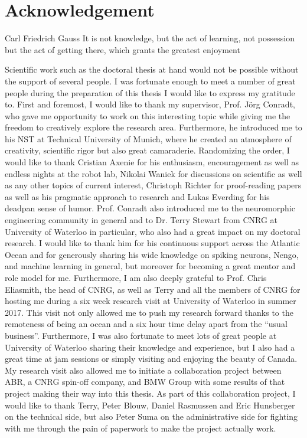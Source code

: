 \chapter*{Acknowledgement}
\begin{chapquote}{Carl Friedrich Gauss}
It is not knowledge, but the act of learning, not possession but the act of getting there, which grants the greatest enjoyment
\end{chapquote}

Scientific work such as the doctoral thesis at hand would not be possible without the support of several people.
I was fortunate enough to meet a number of great people during the preparation of this thesis I would like to express my gratitude to.
First and foremost, I would like to thank my supervisor, Prof. J\"org Conradt, who gave me opportunity to work on this interesting topic while giving me the freedom to creatively explore the research area.
Furthermore, he introduced me to his \acl{NST} at Technical University of Munich, where he created an atmosphere of creativity, scientific rigor but also great camaraderie.
Randomizing the order, I would like to thank Cristian Axenie for his enthusiasm, encouragement as well as endless nights at the robot lab, Nikolai Waniek for discussions on scientific as well as any other topics of current interest, Christoph Richter for proof-reading papers as well as his pragmatic approach to research and Lukas Everding for his deadpan sense of humor.
Prof. Conradt also introduced me to the neuromorphic engineering community in general and to Dr. Terry Stewart from \ac{CNRG} at University of Waterloo in particular, who also had a great impact on my doctoral research.
I would like to thank him for his continuous support across the Atlantic Ocean and for generously sharing his wide knowledge on spiking neurons, Nengo, and machine learning in general, but moreover for becoming a great mentor and role model for me.
Furthermore, I am also deeply grateful to Prof. Chris Eliasmith, the head of \ac{CNRG}, as well as Terry and all the members of \ac{CNRG} for hosting me during a six week research visit at University of Waterloo in summer 2017.
This visit not only allowed me to push my research forward thanks to the remoteness of being an ocean and a six hour time delay apart from the \enquote{usual business}.
Furthermore, I was also fortunate to meet lots of great people at University of Waterloo sharing their knowledge and experience, but I also had a great time at jam sessions or simply visiting and enjoying the beauty of Canada.
My research visit also allowed me to initiate a collaboration project between \ac{ABR}, a \ac{CNRG} spin-off company, and BMW Group with some results of that project making their way into this thesis.
As part of this collaboration project, I would like to thank Terry, Peter Blouw, Daniel Rasmussen and Eric Hunsberger on the technical side, but also Peter Suma on the administrative side for fighting with me through the pain of paperwork to make the project actually work.

